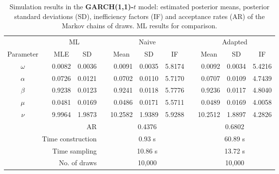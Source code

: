 { \renewcommand{\arraystretch}{1.2} 
\begin{table}[h] 
\footnotesize
\centering 
\caption{Simulation results in the \textbf{GARCH(1,1)-$t$} model: estimated posterior means, posterior standard deviations (SD), inefficiency factors (IF) and acceptance rates (AR) of the Markov chains of draws. ML results for comparison.} 
\label{tab:posterior_t_garch2_noS} 
\begin{tabular}{cc rr c rrr c rrr}  
 & & \multicolumn{2}{c}{ML} & & \multicolumn{3}{c}{Naive} & & \multicolumn{3}{c}{Adapted} \\  \cline{3-4} \cline{6-8} \cline{10-12} 
 Parameter & &  \multicolumn{1}{c}{MLE} &  \multicolumn{1}{c}{SD}  & &  \multicolumn{1}{c}{Mean} &  \multicolumn{1}{c}{SD} &  \multicolumn{1}{c}{IF} & &  \multicolumn{1}{c}{Mean} &  \multicolumn{1}{c}{SD} &  \multicolumn{1}{c}{IF} \\ \cline{1-1}  \cline{3-4} \cline{6-8} \cline{10-12}  
$\omega$ & & 0.0082 &  0.0036 & & 0.0091 &  0.0035 &  5.8174 & & 0.0092 &  0.0034 &  5.4216 \\ [1ex] 
$\alpha$ & & 0.0726 &  0.0121 & & 0.0702 &  0.0110 &  5.7170 & & 0.0707 &  0.0109 &  4.7439 \\ [1ex] 
$\beta$ & & 0.9238 &  0.0123 & & 0.9241 &  0.0118 &  5.7776 & & 0.9236 &  0.0117 &  4.8040 \\ [1ex] 
$\mu$ & & 0.0481 &  0.0169 & & 0.0486 &  0.0171 &  5.5711 & & 0.0489 &  0.0169 &  4.0058 \\ [1ex] 
$\nu$ & & 9.9964 &  1.9873 & &10.2582 &  1.9389 &  5.9288 & &10.2512 &  1.8897 &  4.2826 \\ [1ex] 
\cline{1-1}  \cline{3-4} \cline{6-8} \cline{10-12}   
\multicolumn{4}{r}{AR} & &\multicolumn{3}{c}{0.4376} &&\multicolumn{3}{c}{0.6802} \\ 
  \cline{1-4} \cline{6-8} \cline{10-12}  
 \multicolumn{4}{r}{Time construction} & &\multicolumn{3}{c}{0.93 s} &&\multicolumn{3}{c}{60.89 s} \\ 
   \multicolumn{4}{r}{Time sampling} & &\multicolumn{3}{c}{10.86 s} &&\multicolumn{3}{c}{13.72 s} \\ 
   \multicolumn{4}{r}{No. of draws }& &\multicolumn{3}{c}{10,000} &&\multicolumn{3}{c}{10,000} \\ 
  \cline{1-4} \cline{6-8} \cline{10-12} 
\hline 
\end{tabular} 
\end{table} 
}
\normalsize